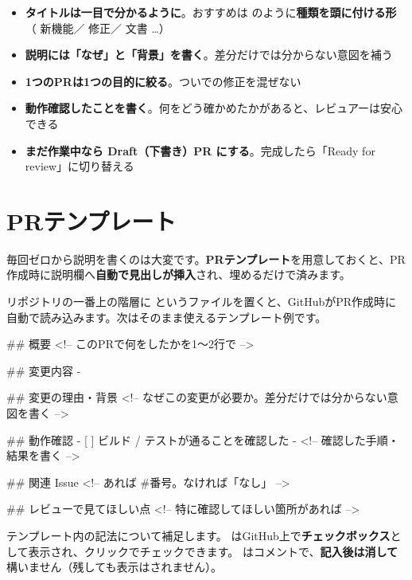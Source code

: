 \begin{itemize}[leftmargin=1.4em]
  \item \textbf{タイトルは一目で分かるように}。おすすめは  のように\textbf{種類を頭に付ける形}（ 新機能／ 修正／ 文書 …）
  \item \textbf{説明には「なぜ」と「背景」を書く}。差分だけでは分からない意図を補う
  \item \textbf{1つのPRは1つの目的に絞る}。ついでの修正を混ぜない
  \item \textbf{動作確認したことを書く}。何をどう確かめたかがあると、レビュアーは安心できる
  \item \textbf{まだ作業中なら Draft（下書き）PR にする}。完成したら「Ready for review」に切り替える
\end{itemize}

\section{PRテンプレート}

毎回ゼロから説明を書くのは大変です。\textbf{PRテンプレート}を用意しておくと、PR作成時に説明欄へ\textbf{自動で見出しが挿入}され、埋めるだけで済みます。

リポジトリの一番上の階層に  というファイルを置くと、GitHubがPR作成時に自動で読み込みます。次はそのまま使えるテンプレート例です。

\begin{codebox}[text]
\begin{code}
## 概要
<!-- このPRで何をしたかを1〜2行で -->

## 変更内容
-

## 変更の理由・背景
<!-- なぜこの変更が必要か。差分だけでは分からない意図を書く -->

## 動作確認
- [ ] ビルド / テストが通ることを確認した
- <!-- 確認した手順・結果を書く -->

## 関連 Issue
<!-- あれば #番号。なければ「なし」 -->

## レビューで見てほしい点
<!-- 特に確認してほしい箇所があれば -->
\end{code}
\end{codebox}

テンプレート内の記法について補足します。\cmd{- [ ]} はGitHub上で\textbf{チェックボックス}として表示され、クリックでチェックできます。 はコメントで、\textbf{記入後は消して}構いません（残しても表示はされません）。

